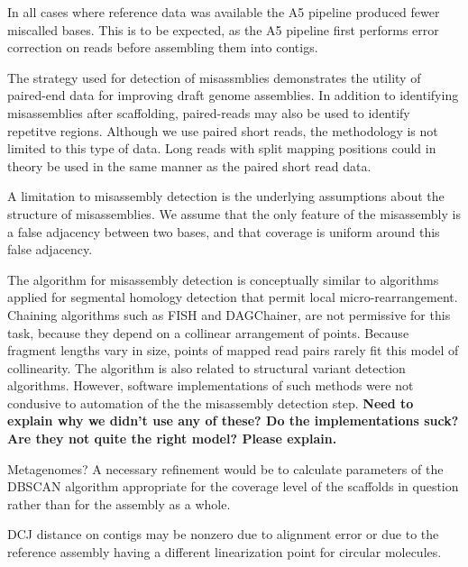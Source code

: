 \documentclass{bioinfo}
\begin{document}
In all cases where reference data was available the A5 pipeline produced fewer miscalled bases. This is to
be expected, as the A5 pipeline first performs error correction on reads before assembling them into contigs.

The strategy used for detection of misassmblies demonstrates the utility of paired-end data for improving draft genome assemblies.
In addition to identifying misassemblies after scaffolding, paired-reads may also be used to identify repetitve regions.   
Although we use paired short reads, the methodology is not limited to this type of data. Long reads with split mapping positions 
could in theory be used in the same manner as the paired short read data.

A limitation to misassembly detection is the underlying assumptions about the structure of misassemblies. We assume that the only
feature of the misassembly is a false adjacency between two bases, and that coverage is uniform around this false adjacency. 

The algorithm for misassembly detection is conceptually similar to algorithms applied for segmental homology detection that permit local 
micro-rearrangement. Chaining algorithms such as FISH and DAGChainer, are not permissive for this task, because they depend on a 
collinear arrangement of points. Because fragment lengths vary in size, points of mapped read pairs rarely fit this model of collinearity. 
The algorithm is also related to structural variant detection algorithms. However, software implementations of such methods were not condusive 
to automation of the the misassembly detection step. \textbf{Need to explain why we didn't use any of these? 
Do the implementations suck? Are they not quite the right model? Please explain.} 

Metagenomes? A necessary refinement would be to calculate parameters of the DBSCAN algorithm appropriate for the coverage level of the 
scaffolds in question rather than for the assembly as a whole.

DCJ distance on contigs may be nonzero due to alignment error or due to the reference assembly having a different linearization point
for circular molecules. 
\end{document}
